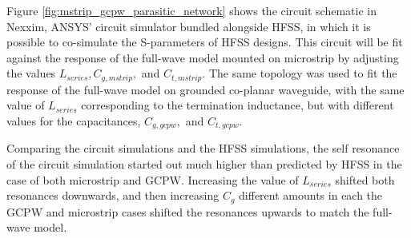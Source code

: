 \documentclass[12pt]{usfcoe}
\begin{document}
     Figure \ref{fig:mstrip_gcpw_parasitic_network} shows the circuit schematic in
     Nexxim, ANSYS' circuit simulator bundled alongside HFSS, in which it is
     possible to co-simulate the S-parameters of HFSS designs. This circuit will
     be fit against the response of the full-wave model mounted on microstrip by
     adjusting the values $L_{series}, C_{g,mstrip},$ and $C_{t,mstrip}$.
     The same topology was used to fit the response of the full-wave model on 
     grounded co-planar waveguide, with the same value of $L_{series}$ 
     corresponding to the termination inductance, but with different values 
     for the capacitances, $C_{g,gcpw},$ and $C_{t,gcpw}$.
        
    Comparing the circuit simulations and the HFSS simulations, the self resonance
    of the circuit simulation started out much higher than predicted by HFSS in the
    case of both microstrip and GCPW. Increasing the value of $L_{series}$ shifted
    both resonances downwards, and then increasing $C_g$ different amounts in 
    each the GCPW and microstrip cases shifted the resonances upwards to match the
    full-wave model.
	    
\end{document}
